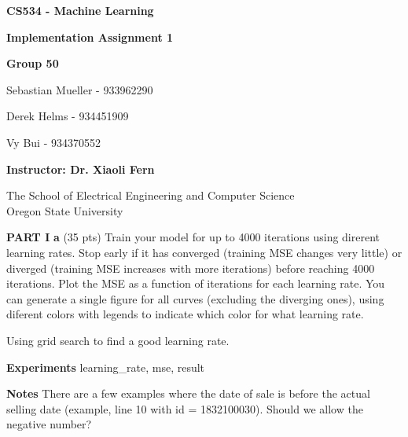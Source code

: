 \documentclass[12pt,article]{article}
\newcommand\projnumber{1}
\begin{document}
\begin{titlepage}
    \begin{center}
        \vspace*{4cm}

        \textbf{\Large CS534 - Machine Learning}

        \vspace{0.5cm}
 
        \textbf{\Large Implementation Assignment \projnumber{}}
 
        \vspace{1cm}

        \textbf{Group 50}

        Sebastian Mueller - 933962290

        Derek Helms - 934451909

        Vy Bui - 934370552

        \vspace{2cm}

        \textbf{Instructor: Dr. Xiaoli Fern}
        \vfill
             
        \vspace{0.8cm}
      
             
        The School of Electrical Engineering and Computer Science\\
        Oregon State University\\
             
    \end{center}
\end{titlepage}

\textbf{PART I} \newline
\textbf{a} (35 pts) Train your model for up to 4000 iterations using direrent 
learning rates. Stop early if it has converged (training MSE changes very little) 
or diverged (training MSE increases with more iterations) before reaching 4000 
iterations. Plot the MSE as a function of iterations for each learning rate. You
can generate a single figure for all curves (excluding the diverging ones), 
using diferent colors with legends to indicate which color for what learning 
rate.

Using grid search to find a good learning rate.

\textbf{Experiments} \newline
learning\_rate, mse, result

\textbf{Notes} \newline
There are a few examples where the date of sale is before the actual selling 
date  (example, line 10 with id = 1832100030). Should we allow the negative 
number?
\end{document}
